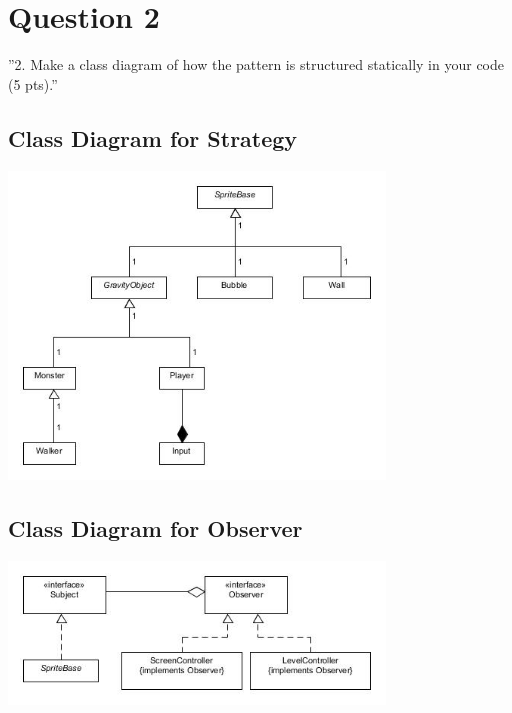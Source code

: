 \section{Question 2}

''2. Make a class diagram of how the pattern is structured statically in your code (5 pts).''

\subsection{Class Diagram for Strategy}

\includegraphics[width=100mm]{classDiagramStrategy.jpg}

\subsection{Class Diagram for Observer}

\includegraphics[width=100mm]{classDiagramObserver.jpg}
